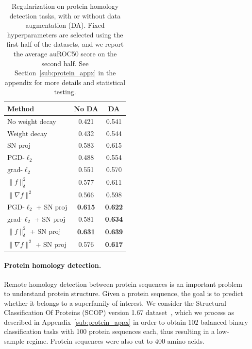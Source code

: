 \begin{table}[tb]
\caption{Regularization on protein homology detection tasks,
with or without data augmentation (DA).
Fixed hyperparameters are selected using the first half of the datasets,
and we report the average auROC50 score on the second half.
See Section~\ref{sub:protein_appx} in the appendix for more details and statistical testing.
}

\label{tab:protein}
\centering
\small
\vspace{0.2cm}
\begin{tabular}{|l|c|c|}
\hline
 Method                       &   No DA &    DA \\ \hline
\hline
 No weight decay              &   0.421 & 0.541 \\
 Weight decay                 &   0.432 & 0.544 \\
 SN proj                      &   0.583 & 0.615 \\
 PGD-$\ell_2$                 &   0.488 & 0.554 \\
 grad-$\ell_2$                &   0.551 & 0.570 \\ \hline
 $\|f\|_{\delta}^2$           &   0.577 & 0.611 \\
 $\|\nabla f\|^2$             &   0.566 & 0.598 \\
 PGD-$\ell_2$ + SN proj       &   \textbf{\color{darkgray}0.615} & \textbf{\color{darkgray}0.622} \\
 grad-$\ell_2$ + SN proj      &   0.581 & \textbf{\color{darkgray}0.634} \\
 $\|f\|_{\delta}^2$ + SN proj &   \textbf{0.631} & \textbf{0.639} \\
 $\|\nabla f\|^2$ + SN proj   &   0.576 & \textbf{\color{darkgray}0.617} \\
\hline
\end{tabular}
\vspace*{-0.1cm}
\end{table}

\vspace{-0.2cm}
\paragraph{Protein homology detection.}
Remote homology detection between protein sequences is an important problem to understand protein structure.
Given a protein sequence, the goal is to predict whether it belongs to a superfamily of interest.
We consider the Structural Classification Of Proteins (SCOP) version 1.67 dataset~\citep{murzin1995scop},
which we process as described in Appendix~\ref{sub:protein_appx}
in order to obtain 102 balanced binary classification tasks with 100 protein sequences each,
thus resulting in a low-sample regime. Protein sequences were also cut to $400$ amino acids.

